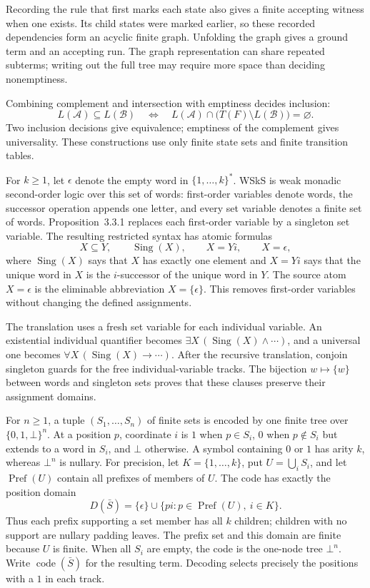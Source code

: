 Recording the rule that first marks each state also gives a finite
accepting witness when one exists.
Its child states were marked earlier, so these recorded dependencies
form an acyclic finite graph.  Unfolding the graph gives a ground
term and an accepting run.
The graph representation can share repeated subterms; writing out
the full tree may require more space than deciding nonemptiness.

Combining complement and intersection with emptiness decides inclusion:
\[
 L(\mathcal A)\subseteq L(\mathcal B)
 \quad\Longleftrightarrow\quad
 L(\mathcal A)\cap\bigl(T(F)\setminus L(\mathcal B)\bigr)=\varnothing.
\]
Two inclusion decisions give equivalence; emptiness of the complement
gives universality.  These constructions use only finite state sets
and finite transition tables.

For \(k\geq1\), let \(\epsilon\) denote the empty word in
\(\{1,\ldots,k\}^{*}\).  WSkS is weak monadic second-order logic over this
set of words: first-order variables denote words, the successor
operation appends one letter, and every set variable denotes a finite set of
words.  Proposition~3.3.1 replaces each first-order variable by a singleton set
variable.  The resulting restricted syntax has atomic formulas
\[
 X\subseteq Y,\qquad \operatorname{Sing}(X),\qquad X=Yi,\qquad X=\epsilon,
\]
where \(\operatorname{Sing}(X)\) says that \(X\) has exactly one element and
\(X=Yi\) says that the unique word in \(X\) is the \(i\)-successor of the
unique word in \(Y\).  The source atom \(X=\epsilon\) is the eliminable
abbreviation \(X=\{\epsilon\}\).  This removes first-order variables without
changing the defined assignments.

The translation uses a fresh set variable for each individual variable.
An existential individual quantifier becomes
\(\exists X\,(\operatorname{Sing}(X)\land\cdots)\), and a universal
one becomes \(\forall X\,(\operatorname{Sing}(X)\to\cdots)\).
After the recursive translation, conjoin singleton guards for the
free individual-variable tracks.
The bijection \(w\mapsto\{w\}\) between words and singleton sets
proves that these clauses preserve their assignment domains.

For \(n\geq1\), a tuple \((S_1,\ldots,S_n)\) of finite sets is encoded by one finite tree over
\(\{0,1,\bot\}^{n}\).  At a position \(p\), coordinate \(i\) is \(1\) when
\(p\in S_i\), \(0\) when \(p\notin S_i\) but extends to a word in \(S_i\),
and \(\bot\) otherwise.  A symbol containing \(0\) or \(1\) has arity \(k\),
whereas \(\bot^{n}\) is nullary.
For precision, let \(K=\{1,\ldots,k\}\), put \(U=\bigcup_i S_i\),
and let \(\operatorname{Pref}(U)\) contain all prefixes of members of \(U\).
The code has exactly the position domain
\[
 D(\bar S)=\{\epsilon\}\cup
                \{pi:p\in\operatorname{Pref}(U),\ i\in K\}.
\]
Thus each prefix supporting a set member has all \(k\) children;
children with no support are nullary padding leaves.
The prefix set and this domain are finite because \(U\) is finite.
When all \(S_i\) are empty, the code is the one-node tree \(\bot^n\).
Write \(\operatorname{code}(\bar S)\) for the resulting term.
Decoding selects precisely the positions with a \(1\) in each track.

